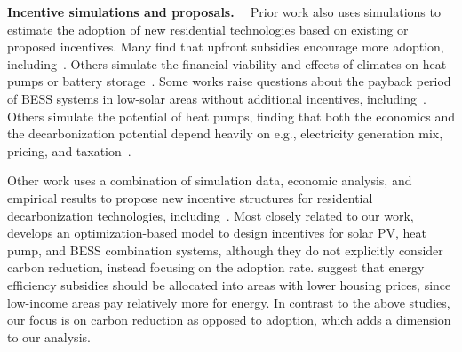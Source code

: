 \noindent\textbf{Incentive simulations and proposals. \ }
Prior work also uses simulations to estimate the adoption of new residential technologies based on existing or proposed incentives.  Many find that upfront subsidies encourage more adoption, including~\cite{Lobel2011, Zhao2012, Hsu2012, Burr2016, Zander2019, Kokoni2021, Sher2022, DAdamo2022, PobleteCazenave2023}.  Others simulate the financial viability and effects of climates on heat pumps or battery storage~\cite{Blumsack2012, Peerapong2014, Agnew2017, Nousdilis2020,Chatterji2020,Vonsien2020, Dougherty2021, Ruffino2022, DAdamo2022}.  Some works raise questions about the payback period of BESS systems in low-solar areas without additional incentives, including~\cite{Jones2017, Zhang2018, Zakeri2021}.  Others simulate the potential of heat pumps, finding that both the economics and the decarbonization potential depend heavily on e.g., electricity generation mix, pricing, and taxation~\cite{Barnes2020, Gaur2021, Kokoni2021,PobleteCazenave2023}.  


Other work uses a combination of simulation data, economic analysis, and empirical results to propose new incentive structures for residential decarbonization technologies, including~\cite{Srinivasan2009, Mulder2013, Hannon2015, Patteeuw2016, Sharma2019, Bunea2020, Varghese2020, Guo2021, Tibebu2021, Chattopadhyay2022, Lin2022}.  Most closely related to our work, \citet{Marinakis2018} develops an optimization-based model to design incentives for solar PV, heat pump, and BESS combination systems, although they do not explicitly consider carbon reduction, instead focusing on the adoption rate.  \citet{Vimpari2021} suggest that energy efficiency subsidies should be allocated into areas with lower housing prices, since low-income areas pay relatively more for energy. 
In contrast to  the above studies,  our focus is  on carbon reduction as opposed to adoption, which adds a dimension to our analysis.




